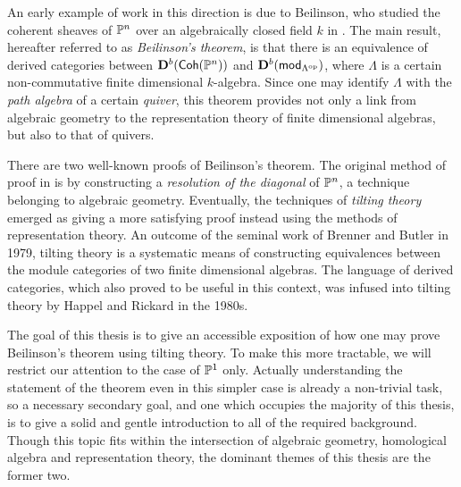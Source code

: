 An early example of work in this direction is due to Beilinson, who
studied the coherent sheaves of $\proj{n}$ over an algebraically
closed field $k$ in \cite{beilinson}.
The main result, hereafter referred to as \emph{Beilinson's theorem},
is that there is an equivalence of derived categories between
$\dercat[b]{\Coh(\proj{n})}$ and $\dercat[b]{\mod{\op{\Lambda}}}$,
where $\Lambda$ is a certain non-commutative finite dimensional $k$-algebra.
Since one may identify $\Lambda$ with the \emph{path algebra} of a
certain \emph{quiver}, this theorem provides not only a link from
algebraic geometry to the representation theory of finite dimensional
algebras, but also to that of quivers.

There are two well-known proofs of Beilinson's theorem.
The original method of proof in \cite{beilinson} is by constructing a
\emph{resolution of the diagonal} of $\proj{n}$, a technique
belonging to algebraic geometry.
Eventually, the techniques of \emph{tilting theory} emerged as giving
a more satisfying proof instead using the methods of representation theory.
An outcome of the seminal work of Brenner and Butler in 1979, tilting
theory is a systematic means of constructing equivalences between the
module categories of two finite dimensional algebras.
The language of derived categories, which also proved to be useful in
this context, was infused into tilting theory by Happel and Rickard
in the 1980s.

The goal of this thesis is to give an accessible exposition of how
one may prove Beilinson's theorem using tilting theory.
To make this more tractable, we will restrict our attention to the
case of $\proj{1}$ only.
Actually understanding the statement of the theorem even in this
simpler case is already a non-trivial task, so a necessary secondary
goal, and one which occupies the majority of this thesis, is to give
a solid and gentle introduction to all of the required background.
Though this topic fits within the intersection of algebraic geometry,
homological algebra and representation theory, the dominant themes of
this thesis are the former two.


